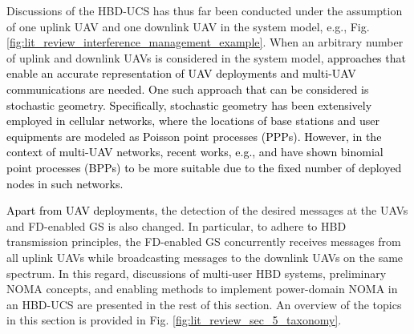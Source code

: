 
Discussions of the HBD-UCS has thus far been conducted under the assumption of one uplink UAV and one downlink UAV in the system model, e.g., Fig. \ref{fig:lit_review_interference_management_example}. When an arbitrary number of uplink and downlink UAVs is considered in the system model, \textcolor{black}{approaches that enable an accurate representation of UAV deployments and multi-UAV communications are needed. One such approach that can be considered is stochastic geometry. Specifically, stochastic geometry has been extensively employed in cellular networks, where the locations of base stations and user equipments are modeled as Poisson point processes (PPPs). However, in the context of multi-UAV networks, recent works, e.g., \cite{chetlur2017downlink} and \cite{wang2018modeling} have shown binomial point processes (BPPs) to be more suitable due to the fixed number of deployed nodes in such networks.}

\textcolor{black}{Apart from UAV deployments,} the detection of the desired messages at the UAVs and FD-enabled GS is also changed. In particular, to adhere to HBD transmission principles, the FD-enabled GS concurrently receives messages from all uplink UAVs while broadcasting messages to the downlink UAVs on the same spectrum. In this regard, discussions of multi-user HBD systems, preliminary NOMA concepts, and enabling methods to implement power-domain NOMA in an HBD-UCS are presented in the rest of this section. An overview of the topics in this section is provided in Fig. \ref{fig:lit_review_sec_5_taxonomy}.

